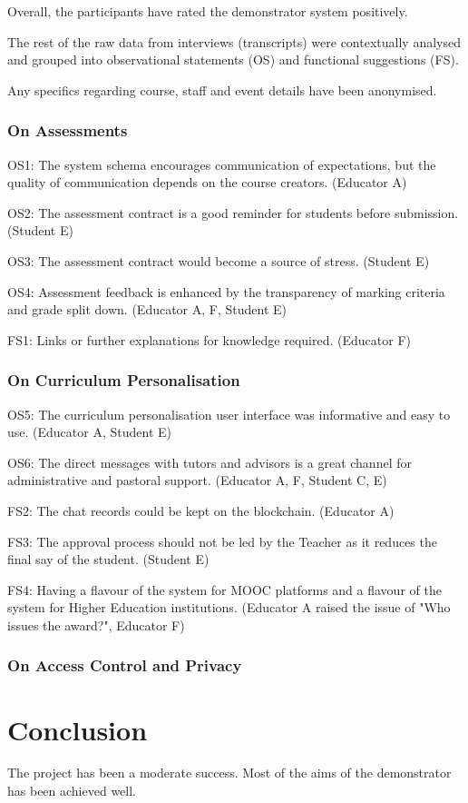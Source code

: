 Overall, the participants have rated the demonstrator system positively.

The rest of the raw data from interviews (transcripts) were contextually analysed and grouped into 
observational statements (OS) and functional suggestions (FS).

Any specifics regarding course, staff and event details have been anonymised.

\subsubsection{On Assessments}

OS1: The system schema encourages communication of expectations, but the quality of communication depends on the course creators.
(Educator A)

OS2: The assessment contract is a good reminder for students before submission.
(Student E)

OS3: The assessment contract would become a source of stress.
(Student E)

OS4: Assessment feedback is enhanced by the transparency of marking criteria and grade split down.
(Educator A, F, Student E)

FS1: Links or further explanations for knowledge required.
(Educator F)

\subsubsection{On Curriculum Personalisation}

OS5: The curriculum personalisation user interface was informative and easy to use.
(Educator A, Student E)

OS6: The direct messages with tutors and advisors is a great channel for administrative and pastoral support. 
(Educator A, F, Student C, E)

FS2: The chat records could be kept on the blockchain.
(Educator A)

FS3: The approval process should not be led by the Teacher as it reduces the final say of the student.
(Student E)

FS4: Having a flavour of the system for MOOC platforms and a flavour of the system for Higher Education institutions.
(Educator A raised the issue of "Who issues the award?", Educator F)

\subsubsection{On Access Control and Privacy}


\section{Conclusion}

The project has been a moderate success. Most of the aims of the demonstrator has been achieved well.